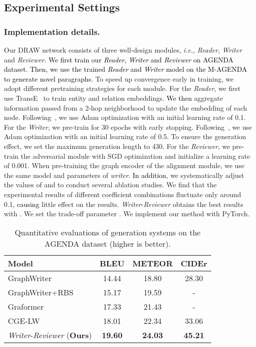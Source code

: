 \documentclass[letterpaper]{article}
\def\hmg{\textcolor{black}}
\def\ie{\emph{i.e., }}
\begin{document}
\subsection{Experimental Settings}
\subsubsection{Implementation details.} 
Our DRAW network consists of three well-design modules, \ie{\textit{Reader}, \textit{Writer} and \textit{Reviewer}.}
\hmg{We first train our \textit{Reader}, \textit{Writer} and \textit{Reviewer} on AGENDA dataset. Then, we use the trained \textit{Reader} and \textit{Writer} model on the M-AGENDA to generate novel paragraphs.}
To speed up convergence early in training, we adopt different pretraining strategies for each module. For the \textit{Reader},
we first use TransE~\cite{NIPS2013_5071} to train entity and relation embeddings. 
\hmg{We then} aggregate information passed from a 2-hop neighborhood to update the embedding of each node.
Following~\cite{Nathani2019LearningAE}, we use Adam optimization with an initial learning rate of 0.1. 
For the \textit{Writer}, we pre-train for 30 epochs with early stopping. Following~\cite{ribeiro2020modeling}, we use Adam optimization with an initial learning rate of 0.5. To ensure the generation effect, we set the maximum generation length to 430.
For the \textit{Reviewer}, we pre-train the adversarial module with SGD optimization and initialize a learning rate of 0.001. When pre-training the graph encoder of the alignment module, we use the same model and parameters of \textit{writer}. \hmg{In addition}, we systematically adjust the values of  and  to conduct several ablation studies.
We find that the experimental results of different coefficient combinations 
fluctuate only around 0.1, \hmg{causing} little effect on the results.
\textit{Writer}-\textit{Reviewer} obtains the best results with { . We set the trade-off parameter }.
We implement our method with PyTorch.


\begin{table}
	\centering
	
	\begin{tabular}{l|c c c }
		\hline
	Model & BLEU & METEOR   &CIDEr
		\\ \hline
		GraphWriter 
		
		& 14.44    & 18.80  &28.30 \\ 
		GraphWriter+RBS  &15.17  & 19.59  &- \\
		Graformer  & 17.33  &21.43  &- \\
		CGE-LW     & 18.01    & 22.34  &33.06  \\ \hline
        \textit{Writer}-\textit{Reviewer} (\textbf{Ours}) & \textbf{19.60}    & \textbf{24.03}  &\textbf{45.21} \\ \hline
	\end{tabular}
	\caption{Quantitative evaluations of generation systems on the AGENDA dataset (higher is better).}
	\label{tab:Automatic Evaluations}
\end{table}
\end{document}
